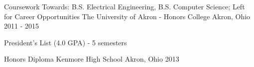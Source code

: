 

\begin{cventries}

  \cventry
    {Coursework Towards: B.S. Electrical Engineering, B.S. Computer Science; Left for Career Opportunities}
    {The University of Akron - Honors College}
    {Akron, Ohio}
    {2011 - 2015}
    {
      \begin{cvitems}
        \item {President's List (4.0 GPA) - 5 semesters}
      \end{cvitems}
    }

  \cventry
    {Honors Diploma}
    {Kenmore High School}
    {Akron, Ohio}
    {2013}
    {}

\end{cventries}
